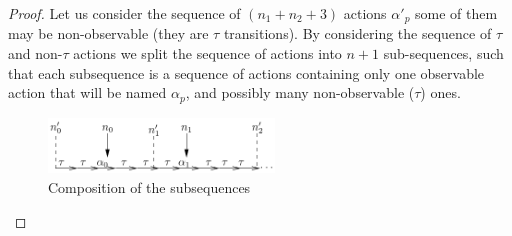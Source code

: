 \documentclass{lmcs}
\begin{document}
\begin{proof}
Let us consider the sequence of $(n_1+n_2+3)$  actions $\alpha'_p$ some of them may be non-observable (they are $\tau$ transitions). By considering the sequence of $\tau$ and non-$\tau$ actions we split the sequence of actions into $n+1$ sub-sequences, such that each subsequence is a sequence of actions containing  only one observable action that will be named $\alpha_p$, and possibly many non-observable ($\tau$) ones. 

\begin{figure}
\begin{center}
\includegraphics[width=6cm]{XFIG/proof-explain}
\end{center}\caption{Composition of the subsequences}\label{figproof}
\end{figure}


\end{proof}
\end{document}
